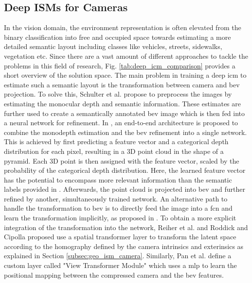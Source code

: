 \subsection{Deep ISMs for Cameras}
\label{subsec:deep_ism_camera}
In the vision domain, the environment representation is often elevated from the binary classification into free and occupied space towards estimating a more detailed semantic layout including classes like vehicles, streets, sidewalks, vegetation etc. Since there are a vast amount of different approaches to tackle the problems in this field of research, Fig. \ref{tab:deep_icm_comparison} provides a short overview of the solution space.
The main problem in training a deep \gls{icm} to estimate such a semantic layout is the transformation between camera and \gls{bev} projection. To solve this, Schulter et al. \cite{schulter2018learning} propose to preprocess the images by estimating the monocular depth and semantic information. These estimates are further used to create a semantically annotated \gls{bev} image which is then fed into a neural network for refinement. In \cite{philion2020lift}, an end-to-end architecture is proposed to combine the monodepth estimation and the \gls{bev} refinement into a single network. This is achieved by first predicting a feature vector and a categorical depth distribution for each pixel, resulting in a 3D point cloud in the shape of a pyramid. Each 3D point is then assigned with the feature vector, scaled by the probability of the categorical depth distribution. Here, the learned feature vector has the potential to encompass more relevant information than the semantic labels provided in \cite{schulter2018learning}. Afterwards, the point cloud is projected into \gls{bev} and further refined by another, simultaneously trained network. An alternative path to handle the transformation to \gls{bev} is to directly feed the image into a \gls{fcn} and learn the transformation implicitly, as proposed in \cite{mani2020monolayout,lu2019monocular}. To obtain a more explicit integration of the transformation into the network, Reiher et al. \cite{reiher2020sim2real} and Roddick and Cipolla \cite{roddick2020predicting} proposed use a spatial transformer layer \cite{jaderberg2015spatial} to transform the latent space according to the homography defined by the camera intrinsics and exterinsics as explained in Section \ref{subsec:geo_ism_camera}. Similarly, Pan et al. \cite{pan2020cross} define a custom layer called "View Transformer Module" which uses a \gls{mlp} to learn the positional mapping between the compressed camera and the \gls{bev} features.
